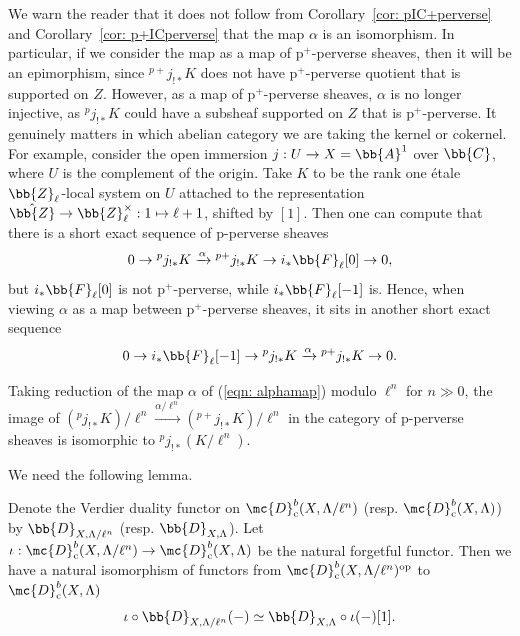 \begin{remark}
    We warn the reader that it does not follow from Corollary~\ref{cor: pIC+perverse} and Corollary~\ref{cor: p+ICperverse} that the map $\alpha$ is an isomorphism. In particular, if we consider the map as a map of p$^+$-perverse sheaves, then it will be an epimorphism, since ${}^{p+}j_{!\ast}K$ does not have p$^+$-perverse quotient that is supported on $Z$. However, as a map of p$^+$-perverse sheaves, $\alpha$ is no longer injective, as ${}^pj_{!\ast}K$ could have a subsheaf supported on $Z$ that is p$^+$-perverse. It genuinely matters in which abelian category we are taking the kernel or cokernel. For example, consider the open immersion $j:U\to X=\bb{A}^1$ over $\bb{C}$, where $U$ is the complement of the origin. Take $K$ to be the rank one \'etale $\bb{Z}_\ell$-local system on $U$ attached to the representation $\hat{\bb{Z}}\to \bb{Z}_\ell^\times: 1\mapsto \ell+1$, shifted by $[1]$. Then one can compute that there is a short exact sequence of p-perverse sheaves
    \[0\to {}^{p}j_{!\ast}K\xrightarrow{\alpha} {}^{p+}j_{!\ast}K \to i_\ast\bb{F}_\ell[0]\to 0, \]
    but $i_\ast\bb{F}_\ell[0]$ is not p$^+$-perverse, while $i_\ast\bb{F}_\ell[-1]$ is. Hence, when viewing $\alpha$ as a map between p$^+$-perverse sheaves, it sits in another short exact sequence
    \[0\to i_\ast\bb{F}_\ell[-1]\to {}^{p}j_{!\ast}K\xrightarrow{\alpha} {}^{p+}j_{!\ast}K\to 0.\]
\end{remark}
\begin{proposition}\label{prop: ImagePerverse}
    Taking reduction of the map $\alpha$ of (\ref{eqn: alphamap}) modulo $\ell^n$ for $n\gg 0$, the image of $({}^{p}j_{!\ast}K)/\ell^n\xrightarrow{\alpha/\ell^n} ({}^{p+}j_{!\ast}K)/\ell^n$ in the category of p-perverse sheaves is isomorphic to ${}^{p}j_{!\ast}(K/\ell^n)$.
\end{proposition}
We need the following lemma.
\begin{lemma}
    Denote the Verdier duality functor on $\mc{D}^b_{\mathrm{c}}(X,\Lambda/\ell^n)$ (resp. $\mc{D}^b_{\mathrm{c}}(X,\Lambda)$) by $\bb{D}_{X,\Lambda/\ell^n}$ (resp. $\bb{D}_{X,\Lambda}$). Let $\iota: \mc{D}^b_{\mathrm{c}}(X,\Lambda/\ell^n)\to \mc{D}^b_{\mathrm{c}}(X,\Lambda)$ be the natural forgetful functor. Then we have a natural isomorphism of functors from $\mc{D}^b_{\mathrm{c}}(X,\Lambda/\ell^n)^\mathrm{op}$ to $\mc{D}^b_{\mathrm{c}}(X,\Lambda)$ 
    \[\iota\circ \bb{D}_{X,\Lambda/\ell^n}(-)\simeq \bb{D}_{X,\Lambda}\circ \iota(-) [1].\]
\end{lemma}
